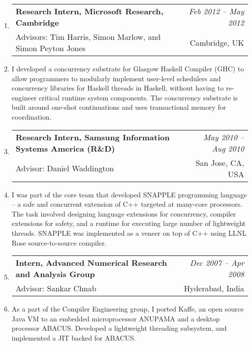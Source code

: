\documentclass[10pt]{article}
\makeatletter
\newcommand{\lbar}[1]{{\color{#1}\ding{118}}\hspace*{2pt}}
\newenvironment{benumerate}[2]{
    \let\oldItem\item
    \def\item{\addtocounter{enumi}{-2}\oldItem}
    \begin{enumerate}[#2] \itemsep3pt
    \setcounter{enumi}{#1}
    \addtocounter{enumi}{1}}
  {\end{enumerate}}
\newenvironment{position}[5]
{%
\item
  \begin{tabular*}{7.5in}{l@{\extracolsep{\fill}}r}
    \textbf{#1} & \textit{#2} \\
		\hspace{1ex} #3 & \small{#4} \\
  \end{tabular*}
\item \hspace{1ex} \parbox{7.3in}{\hspace{4ex}#5}
  }
  { %
}
\newenvironment{region}[3]{%
  \vspace*{0.5ex}
  {\scalebox{1.4}{\textbf{#1}}}
  \begin{benumerate}{#3}{\color{RoyalBlue}#2}}
  {\end{benumerate}\vspace{0.8ex}}
\newenvironment{nonumregion}[1]{%
\begin{region}{#1}{}{1}}
{\end{region}}
\makeatother
\begin{document}
\begin{nonumregion} {\lbar{orange}Experience}
	\begin{position}{Research Intern, Microsoft Research, Cambridge}{Feb 2012 -- May 2012}
		{Advisors: Tim Harris, Simon Marlow, and Simon Peyton Jones}{Cambridge, UK}
		{I developed a concurrency substrate for Glasgow Haskell Compiler (GHC) to
		allow programmers to modularly implement user-level schedulers and
		concurrency libraries for Haskell threads in Haskell, without having to
		re-engineer critical runtime system components. The concurrency substrate
		is built around one-shot continuations and uses transactional memory for
		coordination.}
	\end{position}

	\begin{position}{Research Intern, Samsung Information Systems America (R\&D)}{May 2010 -- Aug 2010}
		{Advisor: Daniel Waddington}{San Jose, CA, USA}
		{I was part of the core team that developed SNAPPLE programming language --
		a safe and concurrent extension of C++ targeted at many-core processors.
		The task involved designing language extensions for concurrency, compiler
		extensions for safety, and a runtime for executing large number of
		lightweight threads. SNAPPLE was implemented as a veneer on top of C++
		using LLNL Rose source-to-source compiler.}
	\end{position}

	\begin{position}{Intern, Advanced Numerical Research and Analysis Group}{Dec 2007 -- Apr 2008}
		{Advisor: Sankar Chnab}{Hyderabad, India}
		{As a part of the Compiler Engineering group, I ported Kaffe, an open
		source Java VM to an embedded microprocessor ANUPAMA and a desktop
		processor ABACUS. Developed a lightweight threading subsystem, and
		implemented a JIT backed for ABACUS.}
	\end{position}
\end{nonumregion}
\end{document}
